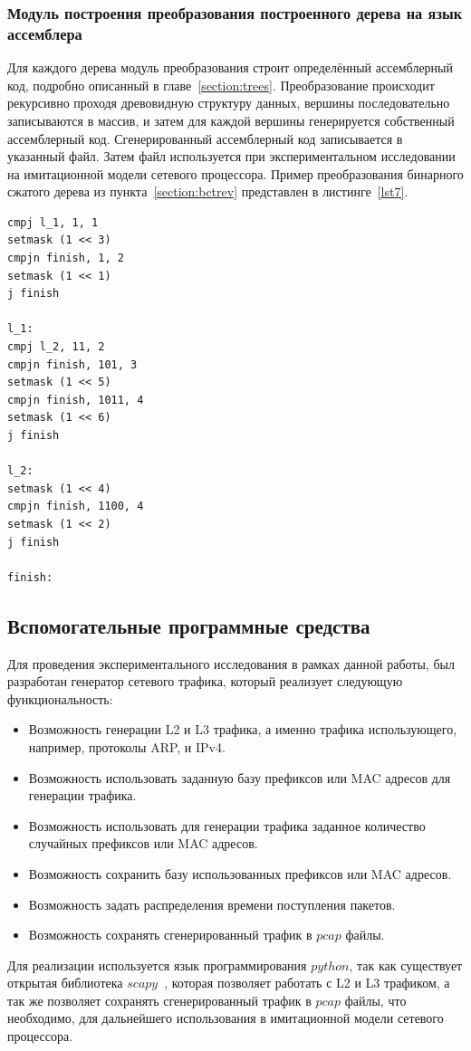 \documentclass[conference]{IEEEtran}
\begin{document}
        \subsubsection{Модуль построения преобразования построенного дерева на язык ассемблера}
            Для каждого дерева модуль преобразования строит определённый ассемблерный код, подробно описанный в главе~\ref{section:trees}.
            Преобразование происходит рекурсивно проходя древовидную структуру данных, вершины последовательно записываются в массив, и затем
            для каждой вершины генерируется собственный ассемблерный код.
            Сгенерированный ассемблерный код записывается в указанный файл. Затем файл используется при экспериментальном исследовании на имитационной модели сетевого процессора.
            Пример преобразования бинарного сжатого дерева из пункта~\ref{section:bctrev} представлен в листинге~\ref{lst7}.\\
\begin{lstlisting}[caption=Пример бинарного сжатого дерева на языке ассемблера., label=lst7]
cmpj l_1, 1, 1
setmask (1 << 3)
cmpjn finish, 1, 2
setmask (1 << 1)
j finish

l_1:
cmpj l_2, 11, 2
cmpjn finish, 101, 3
setmask (1 << 5)
cmpjn finish, 1011, 4
setmask (1 << 6)
j finish

l_2:
setmask (1 << 4)
cmpjn finish, 1100, 4
setmask (1 << 2)
j finish

finish:
\end{lstlisting}

    \subsection{Вспомогательные программные средства}
        Для проведения экспериментального исследования в рамках данной работы, был разработан генератор сетевого трафика,
        который реализует следующую функциональность:
        \begin{itemize}
            \item Возможность генерации L2 и L3 трафика, а именно трафика использующего, например, протоколы ARP, и IPv4.
            \item Возможность использовать заданную базу префиксов или MAC адресов для генерации трафика.
            \item Возможность использовать для генерации трафика заданное количество случайных префиксов или MAC адресов.
            \item Возможность сохранить базу использованных префиксов или MAC адресов.
            \item Возможность задать распределения времени поступления пакетов.
            \item Возможность сохранять сгенерированный трафик в $pcap$ файлы.
        \end{itemize}
        Для реализации используется язык программирования $python$, так как существует открытая библиотека $scapy$~\cite{scapy:1}, которая позволяет работать с L2 и L3 трафиком,
        а так же позволяет сохранять сгенерированный трафик в $pcap$ файлы, что необходимо, для дальнейшего использования в имитационной модели сетевого процессора.
\end{document}
